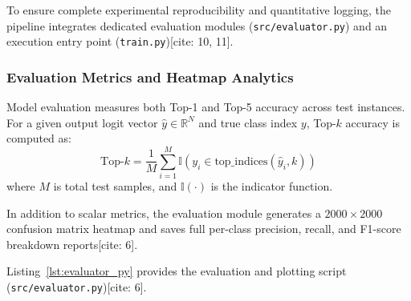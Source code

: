 \documentclass[12pt,a4paper]{article}
\begin{document}
To ensure complete experimental reproducibility and quantitative logging, the pipeline integrates dedicated evaluation modules (\texttt{src/evaluator.py}) and an execution entry point (\texttt{train.py})[cite: 10, 11].

\subsubsection{Evaluation Metrics and Heatmap Analytics}
Model evaluation measures both Top-1 and Top-5 accuracy across test instances. For a given output logit vector $\hat{y} \in \mathbb{R}^N$ and true class index $y$, Top-$k$ accuracy is computed as:
\begin{equation}
\text{Top-}k = \frac{1}{M} \sum_{i=1}^M \mathbb{I}\left( y_i \in \text{top\_indices}(\hat{y}_i, k) \right)
\end{equation}
where $M$ is total test samples, and $\mathbb{I}(\cdot)$ is the indicator function.

In addition to scalar metrics, the evaluation module generates a $2000 \times 2000$ confusion matrix heatmap and saves full per-class precision, recall, and F1-score breakdown reports[cite: 6].

Listing~\ref{lst:evaluator_py} provides the evaluation and plotting script (\texttt{src/evaluator.py})[cite: 6].
\end{document}
